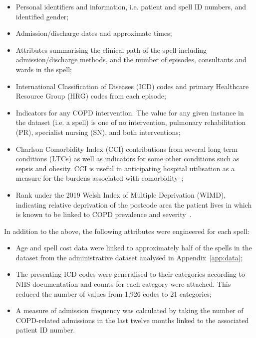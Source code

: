 \begin{itemize}
    \item Personal identifiers and information, i.e. patient and spell ID
        numbers, and identified gender;
    \item Admission/discharge dates and approximate times;
    \item Attributes summarising the clinical path of the spell including
        admission/discharge methods, and the number of episodes, consultants and
        wards in the spell;
    \item International Classification of Diseases (ICD) codes and primary
        Healthcare Resource Group (HRG) codes from each episode;
    \item Indicators for any COPD intervention. The value for any given instance
        in the dataset (i.e. a spell) is one of no intervention, pulmonary
        rehabilitation (PR), specialist nursing (SN), and both interventions;
    \item Charlson Comorbidity Index (CCI) contributions from several long term
        conditions (LTCs) as well as indicators for some other conditions such
        as sepsis and obesity. CCI is useful in anticipating hospital
        utilisation as a measure for the burdens associated with
        comorbidity~\cite{Simon2011};
    \item Rank under the 2019 Welsh Index of Multiple Deprivation (WIMD),
        indicating relative deprivation of the postcode area the patient lives
        in which is known to be linked to COPD prevalence and
        severity~\cite{Collins2018,Sexton2016,Steiner2017}.
\end{itemize}

In addition to the above, the following attributes were engineered for each
spell:

\begin{itemize}
    \item Age and spell cost data were linked to approximately half of the
        spells in the dataset from the administrative dataset analysed in
        Appendix~\ref{app:data};
    \item The presenting ICD codes were generalised to their categories
        according to NHS documentation and counts for each category were
        attached. This reduced the number of values from
        1,926 codes to 21 categories;
    \item A measure of admission frequency was calculated by taking the number
        of COPD-related admissions in the last twelve months linked to the
        associated patient ID number.
\end{itemize}

